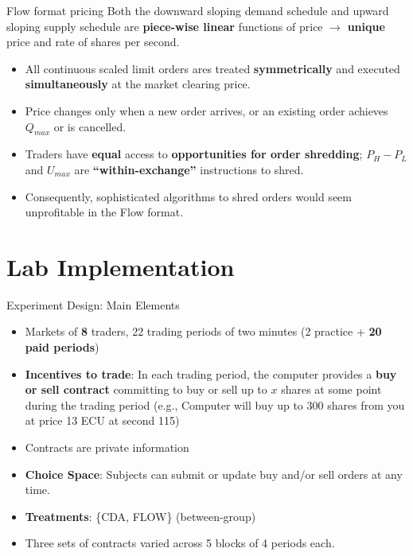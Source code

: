 \documentclass[10pt]{beamer}
\begin{document}
\begin{frame}{Flow format pricing}
Both the downward sloping demand schedule and upward sloping supply schedule are \textbf{piece-wise linear} functions of price $\rightarrow$ \textbf{unique} price and rate of shares per second. %
\begin{itemize}
\item All continuous scaled limit orders ares treated \textbf{symmetrically} and executed \textbf{simultaneously} at the market clearing price. %
\item Price changes only when a new order arrives, or an existing order achieves $Q_{max}$ or is cancelled.
\item Traders have \textbf{equal} access to \textbf{opportunities for order shredding}; $P_H - P_L$ and $U_{max}$ are  \textbf{``within-exchange''}
instructions to shred. %
\item Consequently, sophisticated algorithms to shred orders would seem unprofitable in the Flow format.
    \end{itemize}
\end{frame}

\section{Lab Implementation}

\begin{frame}{Experiment Design: Main Elements}
    \begin{itemize}
        \item Markets of \textbf{8} traders, 22 trading periods of two minutes (2 practice + \textbf{20 paid periods})
        \item \textbf{Incentives to trade}: In each trading period, the computer provides a \textbf{buy or sell contract} committing to buy or sell up to $x$ shares at some point during the trading period (e.g., Computer will buy up to 300 shares from you at price 13 ECU at second 115) 
        \item Contracts are private information %
        \item \textbf{Choice Space}: Subjects can submit or update buy and/or sell orders at any time. %
        \item \textbf{Treatments}: \{CDA, FLOW\} (between-group)
        \item Three sets of contracts varied across 5 blocks of 4 periods each. 
    \end{itemize}
\end{frame}
\end{document}
